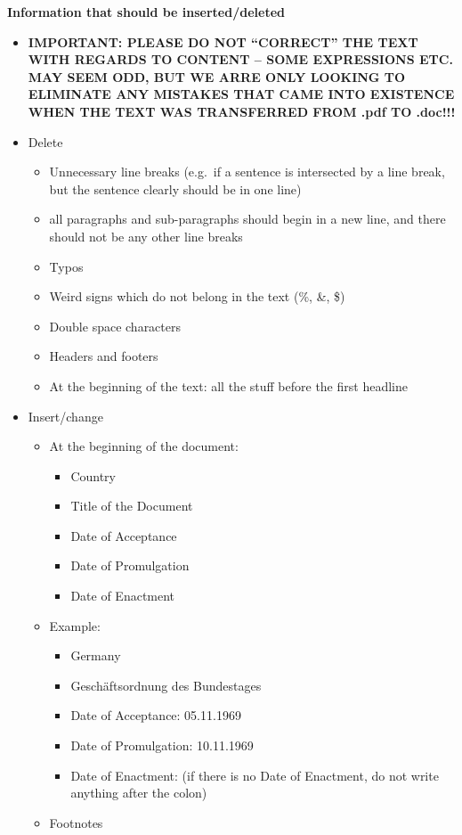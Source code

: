 \documentclass[10pt,]{article}
\providecommand{\tightlist}{%
  \setlength{\itemsep}{0pt}\setlength{\parskip}{0pt}}
\begin{document}
\textbf{Information that should be inserted/deleted}

\begin{itemize}
\tightlist
\item
  \textbf{IMPORTANT: PLEASE DO NOT ``CORRECT'' THE TEXT WITH REGARDS TO
  CONTENT -- SOME EXPRESSIONS ETC. MAY SEEM ODD, BUT WE ARRE ONLY
  LOOKING TO ELIMINATE ANY MISTAKES THAT CAME INTO EXISTENCE WHEN THE
  TEXT WAS TRANSFERRED FROM .pdf TO .doc!!!}
\item
  Delete

  \begin{itemize}
  \tightlist
  \item
    Unnecessary line breaks (e.g.~if a sentence is intersected by a line
    break, but the sentence clearly should be in one line)
  \item
    all paragraphs and sub-paragraphs should begin in a new line, and
    there should not be any other line breaks
  \item
    Typos
  \item
    Weird signs which do not belong in the text (\%, \&, \$)
  \item
    Double space characters
  \item
    Headers and footers
  \item
    At the beginning of the text: all the stuff before the first
    headline
  \end{itemize}
\item
  Insert/change

  \begin{itemize}
  \tightlist
  \item
    At the beginning of the document:

    \begin{itemize}
    \tightlist
    \item
      Country
    \item
      Title of the Document
    \item
      Date of Acceptance
    \item
      Date of Promulgation
    \item
      Date of Enactment
    \end{itemize}
  \item
    Example:

    \begin{itemize}
    \tightlist
    \item
      Germany
    \item
      Geschäftsordnung des Bundestages
    \item
      Date of Acceptance: 05.11.1969
    \item
      Date of Promulgation: 10.11.1969
    \item
      Date of Enactment: (if there is no Date of Enactment, do not write
      anything after the colon)
    \end{itemize}
  \item
    Footnotes


\end{itemize}
\end{itemize}
\end{document}
